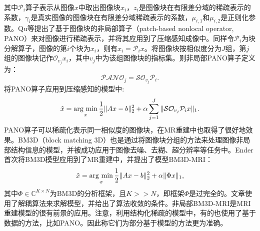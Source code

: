 其中$\mathcal{P}_i$算子表示从图像$x$中取出图像块$x_i$，$z_i$是图像块在有限差分域的稀疏表示的系数，$\gamma_i$是真实图像的图像块在有限差分域稀疏表示的系数，$\mu_{i,1}$和$\mu_{i,2}$是正则化参数。Qu等\cite{qu2014magnetic}提出了基于图像块的非局部算子（patch-based nonlocal operator, PANO）来对图像进行稀疏表示，并将其应用到了压缩感知成像中。同样令$\mathcal{P}_i$为块分解算子，图像的第$i$个块为$x_i$，则有$x_i=\mathcal{P}_ix$。将图像块按相似度分为$J$组，第$j$组的图像块记作$\mathcal{O}_{v_j}x_i$，其中$v_j$中为该组图像块的指标集。则非局部PANO算子定义为：
$$\mathcal{PANO}_j=\mathcal{S}\mathcal{O}_{v_j}\mathcal{P}_i.$$
将PANO算子应用到压缩感知的模型中:
\begin{equation}
	\hat{x}=\argmin_x \frac{1}{2}\|Ax-b\|_2^2 + \alpha\sum^J_{j=1}\|\mathcal{S}\mathcal{O}_{v_j}\mathcal{P}_ix\|_1.
\end{equation}
PANO算子可以稀疏化表示同一相似度的图像块，在MR重建中也取得了很好地效果。BM3D（block matching 3D）\cite{dabov2007image}也是通过将图像块分组的方法来处理图像非局部结构信息的模型，并被成功应用于图像去噪、去糊、超分辨率等任务中。Ender\cite{eksioglu2016decoupled}首次将BM3D模型应用到了MR重建中，并提出了模型BM3D-MRI：
\begin{equation}
	\hat{x}=\argmin_x \frac{1}{2}\|Ax-b\|^2_2+\alpha\|\Phi x\|_1,
\end{equation}
其中$\Phi\in\mathbb{C}^{K\times N}$为BM3D的分析框架，且$K>>N$，即框架$\Phi$是过完全的。文章使用了解耦算法来求解模型，并给出了算法收敛的条件。非局部BM3D-MRI是MRI重建模型的很有前景的应用。注意，利用结构化稀疏的模型中，有的也使用了基于数据的方法，比如PANO。因此称它们为部分基于模型的方法更为准确。

